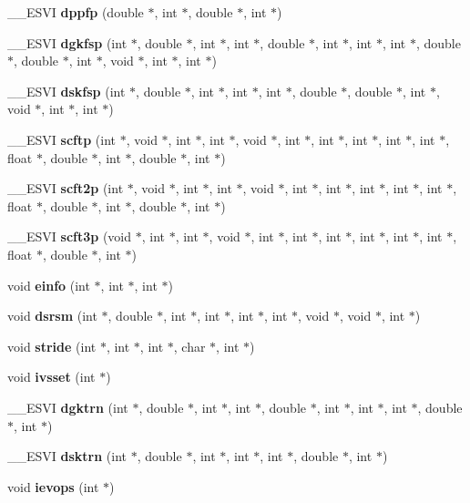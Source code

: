 \begin{CompactItemize}
\_\-\_\-ESVI {\bf dppfp} (double $\ast$, int $\ast$, double $\ast$, int $\ast$)
\item 
\_\-\_\-ESVI {\bf dgkfsp} (int $\ast$, double $\ast$, int $\ast$, int $\ast$, double $\ast$, int $\ast$, int $\ast$, int $\ast$, double $\ast$, double $\ast$, int $\ast$, void $\ast$, int $\ast$, int $\ast$)
\item 
\_\-\_\-ESVI {\bf dskfsp} (int $\ast$, double $\ast$, int $\ast$, int $\ast$, int $\ast$, double $\ast$, double $\ast$, int $\ast$, void $\ast$, int $\ast$, int $\ast$)
\item 
\_\-\_\-ESVI {\bf scftp} (int $\ast$, void $\ast$, int $\ast$, int $\ast$, void $\ast$, int $\ast$, int $\ast$, int $\ast$, int $\ast$, int $\ast$, float $\ast$, double $\ast$, int $\ast$, double $\ast$, int $\ast$)
\item 
\_\-\_\-ESVI {\bf scft2p} (int $\ast$, void $\ast$, int $\ast$, int $\ast$, void $\ast$, int $\ast$, int $\ast$, int $\ast$, int $\ast$, int $\ast$, float $\ast$, double $\ast$, int $\ast$, double $\ast$, int $\ast$)
\item 
\_\-\_\-ESVI {\bf scft3p} (void $\ast$, int $\ast$, int $\ast$, void $\ast$, int $\ast$, int $\ast$, int $\ast$, int $\ast$, int $\ast$, int $\ast$, float $\ast$, double $\ast$, int $\ast$)
\item 
void {\bf einfo} (int $\ast$, int $\ast$, int $\ast$)
\item 
void {\bf dsrsm} (int $\ast$, double $\ast$, int $\ast$, int $\ast$, int $\ast$, int $\ast$, void $\ast$, void $\ast$, int $\ast$)
\item 
void {\bf stride} (int $\ast$, int $\ast$, int $\ast$, char $\ast$, int $\ast$)
\item 
void {\bf ivsset} (int $\ast$)
\item 
\_\-\_\-ESVI {\bf dgktrn} (int $\ast$, double $\ast$, int $\ast$, int $\ast$, double $\ast$, int $\ast$, int $\ast$, int $\ast$, double $\ast$, int $\ast$)
\item 
\_\-\_\-ESVI {\bf dsktrn} (int $\ast$, double $\ast$, int $\ast$, int $\ast$, int $\ast$, double $\ast$, int $\ast$)
\item 
void {\bf ievops} (int $\ast$)
\end{CompactItemize}

